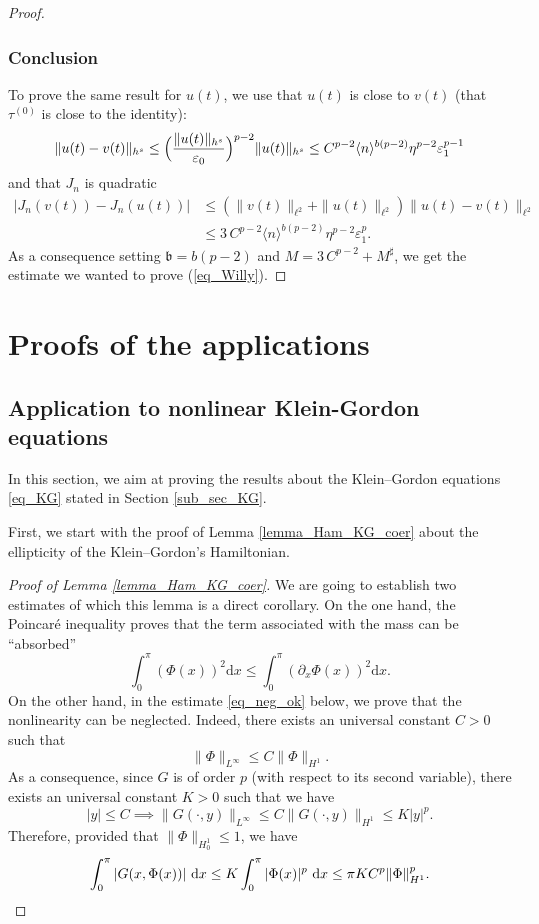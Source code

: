 \begin{proof}
\subsubsection*{Conclusion}
To prove the same result for $u(t)$, we use that $u(t)$ is close to $v(t)$ (\ie that $\tau^{(0)}$ is close to the identity):
\[
\| u(t) - v(t) \|_{h^s} \leq \Bigl(\frac{\|u(t) \|_{h^s}}{\varepsilon_0} \Bigr)^{p-2} \| u(t) \|_{h^s} \leq C^{p-2} \langle n \rangle^{b(p-2)} \eta^{p-2} \varepsilon_1^{p-1}
\]
and that $J_n$ is quadratic
\begin{equation*}
\begin{split}
| J_n(v(t)) - J_n(u(t)) | &\leq (\| v(t) \|_{\ell^2} + \| u(t) \|_{\ell^2}) \| u(t) -v(t)\|_{\ell^2} \\
&\leq 3 \, C^{p-2} \langle n \rangle^{b(p-2)} \eta^{p-2} \varepsilon_1^{p}.
\end{split}
\end{equation*}
As a consequence setting $\mathfrak{b} = b(p-2)$ and $M = 3 \, C^{p-2} + M^\sharp$, we get the estimate we wanted to prove (\ie \eqref{eq_Willy}).
\end{proof}

\section{Proofs of the applications}
\label{sec_proofs}

\subsection{Application to nonlinear Klein-Gordon equations}
\label{sec_KG}
In this section, we aim at proving the results about the Klein--Gordon equations \eqref{eq_KG} stated in Section \ref{sub_sec_KG}.

First, we start with the proof of Lemma \ref{lemma_Ham_KG_coer} about the ellipticity of the Klein--Gordon's Hamiltonian.
\begin{proof}[Proof of Lemma \ref{lemma_Ham_KG_coer}] We are going to establish two estimates of which this lemma is a direct corollary. On the one hand, the Poincaré inequality proves that the term associated with the mass can be ``absorbed''
\[
\int_0^\pi (\Phi(x))^2 \mathrm{d}x \leq \int_0^\pi (\partial_x \Phi(x))^2 \mathrm{d}x.
\]
On the other hand, in the estimate \eqref{eq_neg_ok} below, we prove that the nonlinearity can be neglected. Indeed, there exists an universal constant $C>0$ such that
\[
\| \Phi \|_{L^\infty} \leq C \| \Phi \|_{H^1}.
\]
As a consequence, since $G$ is of order $p$ (with respect to its second variable), there exists an universal constant $K>0$ such that we have
\[
|y|\leq C \implies \|G(\cdot,y)\|_{L^\infty} \leq C\|G(\cdot,y)\|_{H^1} \leq K |y|^p.
\]
Therefore, provided that $\| \Phi \|_{H^1_0}\leq 1$, we have
\begin{equation}
\label{eq_neg_ok}
\int_0^\pi |G(x,\Phi(x))| \ \mathrm{d}x \leq K \int_0^\pi |\Phi(x)|^p \ \mathrm{d}x \leq \pi K C^p \| \Phi \|_{H^1}^p.\qedhere
\end{equation}
\end{proof}

